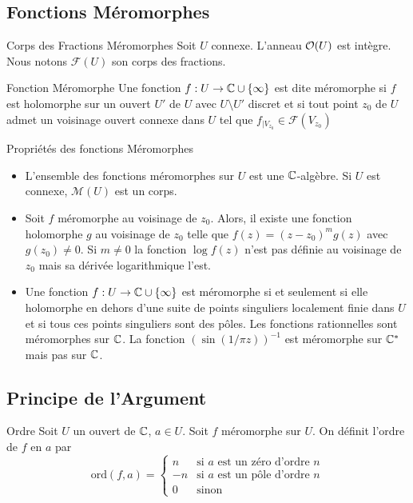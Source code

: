 \documentclass{cours}
\begin{document}
\subsection{Fonctions Méromorphes}
\begin{définition}
	{Corps des Fractions Méromorphes}{}
	Soit $U$ connexe. L'anneau $\mathcal{O}(U)$ est intègre. Nous notons $\mathcal{F}(U)$ son corps des fractions. 
\end{définition}

\begin{définition}
	{Fonction Méromorphe}{}
	Une fonction $f: U \to \mathbb{C}\cup\{\infty\}$ est dite méromorphe si $f$ est holomorphe sur un ouvert $U'$ de $U$ avec $U\setminus U'$ discret et si tout point $z_{0}$ de $U$ admet un voisinage ouvert connexe dans $U$ tel que $f_{\mid V_{z_{0}}} \in \mathcal{F}\left(V_{z_{0}}\right)$ 
\end{définition}

\begin{propositionfr}
	{Propriétés des fonctions Méromorphes}{}
	\begin{itemize}
	\item L'ensemble des fonctions méromorphes sur $U$ est une $\mathbb{C}$-algèbre. Si $U$ est connexe, $\mathcal{M}(U)$ est un corps. 
	\item Soit $f$ méromorphe au voisinage de $z_{0}$. Alors, il existe une fonction holomorphe $g$ au voisinage de $z_{0}$ telle que $f(z) = (z - z_{0})^{m}g(z)$ avec $g(z_{0}) \neq 0$. Si $m \neq 0$ la fonction $\log f(z)$ n'est pas définie au voisinage de $z_{0}$ mais sa dérivée logarithmique l'est.
	\item Une fonction $f: U \to \mathbb{C}\cup \{\infty\}$ est méromorphe si et seulement si elle holomorphe en dehors d'une suite de points singuliers localement finie dans $U$ et si tous ces points singuliers sont des pôles. 
		Les fonctions rationnelles sont méromorphes sur $\mathbb{C}$. La fonction $\left(\sin(1/\pi z)\right)^{-1}$ est méromorphe sur $\mathbb{C}^{*}$ mais pas sur $\mathbb{C}$. 
	\end{itemize}
\end{propositionfr}

\subsection{Principe de l'Argument}
\begin{définition}
	{Ordre}{}
	Soit $U$ un ouvert de $\mathbb{C}$, $a\in U$. Soit $f$ méromorphe sur $U$. On définit l'ordre de $f$ en $a$ par
	\begin{equation*}
			\mathrm{ord}(f, a) = 
			\begin{cases}
		n & \text{si } a \text{ est un zéro d'ordre } n\\
		-n & \text{si } a \text{ est un pôle d'ordre } n\\
		0 & \text{sinon}
	\end{cases}
	\end{equation*}
\end{définition}
\end{document}
